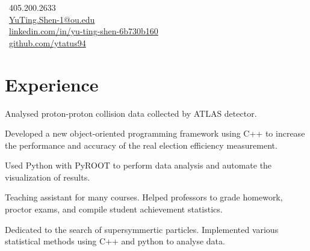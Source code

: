 \documentclass[letterpaper]{deedy-resume-openfont}
\begin{document}
%
%
\lastupdated

%
%

{
    \faPhone \ 405.200.2633\\
    \faEnvelope \ \href{mailto:YuTing.Shen-1@ou.edu}{YuTing.Shen-1@ou.edu}\\
    \faLinkedinSquare \ \href{https://www.linkedin.com/in/yu-ting-shen-6b730b160/}{linkedin.com/in/yu-ting-shen-6b730b160}\\
    \faGithub \ \href{https://github.com/ytatus94}{github.com/ytatus94}
}




\section{Experience}

\begin{tightemize}
\item Analysed proton-proton collision data collected by ATLAS detector.
\item Developed a new object-oriented programming framework using C++ to increase the performance and accuracy of the real election efficiency measurement.
\item Used Python with PyROOT to perform data analysis and automate the visualization of results.
\end{tightemize}
\sectionsep

\begin{tightemize}
\item Teaching assistant for many courses. Helped professors to grade homework, proctor exams, and compile student achievement statistics.
\item Dedicated to the search of supersymmertic particles. Implemented various statistical methods using C++ and python to analyse data.
\end{tightemize}
\sectionsep
\end{document}
